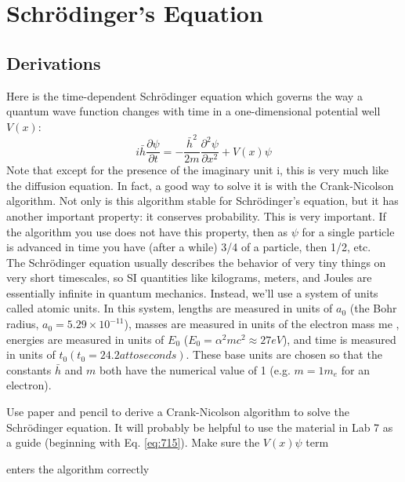 
\chapter*{Schr{\"o}dinger\rq s Equation}
\section*{Derivations}

Here is the time-dependent Schr{\"o}dinger equation which governs the way a quantum wave function changes with time in a one-dimensional potential well $V(x)$:
\begin{equation}\label{eq:81}
i \bar{h} \frac{\partial \psi}{\partial t}=-\frac{\bar{h}^{2}}{2 m} \frac{\partial^{2} \psi}{\partial x^{2}}+V(x) \psi
\end{equation}
Note that except for the presence of the imaginary unit i, this is very much like
the diffusion equation. In fact, a good way to solve it is with the Crank-Nicolson
algorithm. Not only is this algorithm stable for Schr{\"o}dinger\rq s equation, but it has
another important property: it conserves probability. This is very important. If
the algorithm you use does not have this property, then as $\psi$ for a single particle
is advanced in time you have (after a while) 3/4 of a particle, then 1/2, etc. \\
The Schr{\"o}dinger equation usually describes the behavior of very tiny things
on very short timescales, so SI quantities like kilograms, meters, and Joules are
essentially infinite in quantum mechanics. Instead, we\rq ll use a system of units
called atomic units. In this system, lengths are measured in units of $a_0$ (the Bohr
radius, $a_0 = 5.29×10^{−11}$), masses are measured in units of the electron mass me ,
energies are measured in units of $E_0$ ($E_0 = \alpha^2mc^2 \approx 27 eV$), and time is measured
in units of $t_0 (t_0 = 24.2 attoseconds)$. These base units are chosen so that the
constants $\bar{h}$ and $m$ both have the numerical value of 1 (e.g. $m = 1m_e$ for an electron).
\begin{problem}\label{P8.1}
Use paper and pencil to derive a Crank-Nicolson algorithm to solve the
Schr{\"o}dinger equation. It will probably be helpful to use the material in
Lab 7 as a guide (beginning with Eq. \ref{eq:715}). Make sure the $V(x)\psi$ term\end{problem}
enters the algorithm correctly
